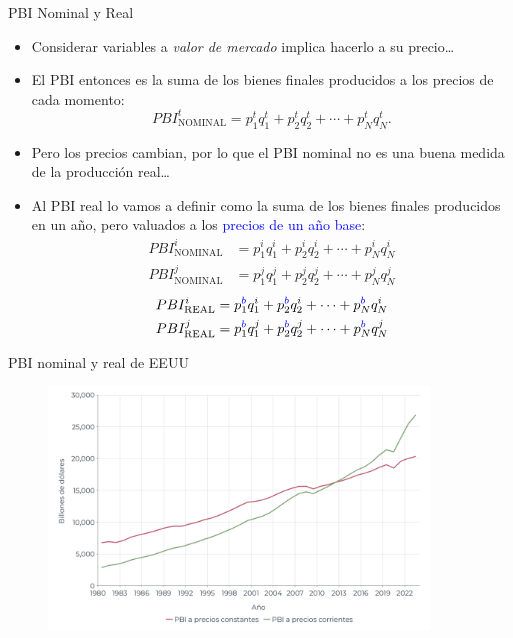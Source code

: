 \documentclass{beamer}
\begin{document}
\begin{frame}{PBI Nominal y Real}
    \begin{itemize}
        \item Considerar variables a \textit{valor de mercado} implica hacerlo a su precio\dots
        \item El PBI entonces es la suma de los bienes finales producidos a los precios de cada momento:
        \begin{equation*}
            PBI_{\text{NOMINAL}}^t = p_1^t q_1^t + p_2^t q_2^t + \cdots + p_N^t q_N^t.
        \end{equation*}
        \item Pero los precios cambian, por lo que el PBI nominal no es una buena medida de la producción real\dots
        \item Al PBI real lo vamos a definir como la suma de los bienes finales producidos en un año, pero valuados a los {\textcolor{blue}{precios de un año base}}:
        \begin{align*}
            PBI_{\text{NOMINAL}}^i &= p_1^i q_1^i + p_2^i q_2^i + \cdots + p_N^i q_N^i \\
            PBI_{\text{NOMINAL}}^j &= p_1^j q_1^j + p_2^j q_2^j + \cdots + p_N^j q_N^j
        \end{align*}
        \begin{align*}
            PBI_{\text{REAL}}^i &= p_1^{\textcolor{blue}{b}} q_1^i + p_2^{\textcolor{blue}{b}} q_2^i + \cdots + p_N^{\textcolor{blue}{b}} q_N^i \\
            PBI_{\text{REAL}}^j &= p_1^{\textcolor{blue}{b}} q_1^j + p_2^{\textcolor{blue}{b}} q_2^j + \cdots + p_N^{\textcolor{blue}{b}} q_N^j
        \end{align*}
    \end{itemize}
\end{frame}


\begin{frame}{PBI nominal y real de EEUU}
    \begin{figure} [H]   \includegraphics[width=0.9\textwidth]{../Figures/29.8.pdf}
\end{figure}
\end{frame}
\end{document}
